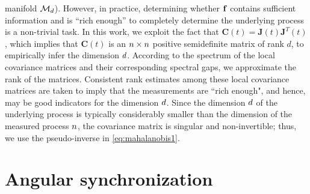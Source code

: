 manifold $\mathcal{M}_d$).
%
However, in practice, determining whether $\mathbf{f}$ contains sufficient information and is ``rich enough'' to completely determine the underlying process is a non-trivial task.
%
In this work, we exploit the fact that $\mathbf{C}(t) = \mathbf{J}(t)\mathbf{J}^T(t)$, which implies that $\mathbf{C}(t)$ is an $n \times n$ positive semidefinite matrix of rank $d$, to empirically infer the dimension $d$.
%
According to the spectrum of the local covariance matrices and their corresponding spectral gaps, we approximate the rank of the matrices.
%
Consistent rank estimates among these local covariance matrices are taken to imply that the measurements are ``rich enough", and hence, may be good indicators for the dimension $d$.
%
Since the dimension $d$ of the underlying process is typically considerably smaller than the dimension of the measured process $n$,
the covariance matrix is singular and non-invertible;
%
thus, we use the pseudo-inverse in \eqref{eq:mahalanobis1}.


\section{Angular synchronization }

